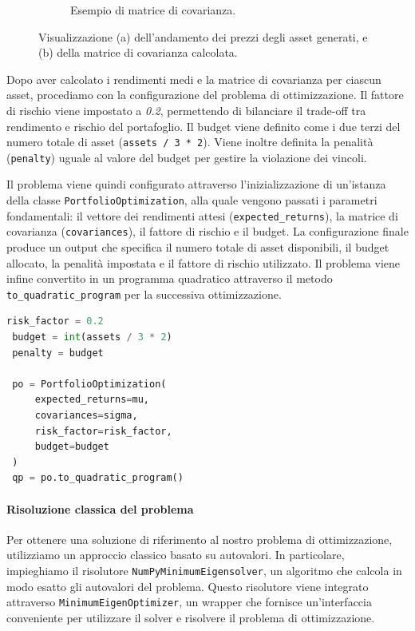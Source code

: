 \begin{figure}[h!]
\begin{subfigure}{0.45\textwidth}
        \caption{Esempio di matrice di covarianza.}
        \label{fig:matriceCovarianza}
    \end{subfigure}
    \caption{Visualizzazione (a) dell'andamento dei prezzi degli asset generati, e (b) della matrice di covarianza calcolata.}
\end{figure}

Dopo aver calcolato i rendimenti medi e la matrice di covarianza per ciascun 
asset, procediamo con la configurazione del problema di ottimizzazione. 
Il fattore di rischio viene impostato a \textit{0.2}, permettendo di bilanciare il 
trade-off tra rendimento e rischio del portafoglio. Il budget viene definito come 
i due terzi del numero totale di asset (\texttt{assets / 3 * 2}). Viene inoltre 
definita la penalità (\texttt{penalty}) uguale al valore del budget per gestire la 
violazione dei vincoli.

Il problema viene quindi configurato attraverso l'inizializzazione di 
un'istanza della classe \texttt{PortfolioOptimization}, alla quale vengono 
passati i parametri fondamentali: il vettore dei rendimenti attesi 
(\texttt{expected\_returns}), la matrice di covarianza (\texttt{covariances}), 
il fattore di rischio e il budget. La configurazione finale produce 
un output che specifica il numero totale di asset disponibili, 
il budget allocato, la penalità impostata e il fattore di rischio 
utilizzato. Il problema viene infine convertito in un programma 
quadratico attraverso il metodo \texttt{to\_quadratic\_program} per la 
successiva ottimizzazione.

\begin{lstlisting}[language=python, caption={Configurazione del problema di ottimizzazione del portafoglio.}]
 risk_factor = 0.2
 budget = int(assets / 3 * 2)
 penalty = budget

 po = PortfolioOptimization(
     expected_returns=mu, 
     covariances=sigma, 
     risk_factor=risk_factor, 
     budget=budget
 )
 qp = po.to_quadratic_program()
\end{lstlisting}

\paragraph{Risoluzione classica del problema}
Per ottenere una soluzione di riferimento al nostro problema di ottimizzazione, 
utilizziamo un approccio classico basato su autovalori. In particolare, 
impieghiamo il risolutore \texttt{NumPyMinimumEigensolver}, un algoritmo 
che calcola in modo esatto gli autovalori del problema. Questo risolutore 
viene integrato attraverso \texttt{MinimumEigenOptimizer}, un wrapper  
che fornisce un'interfaccia conveniente per utilizzare il solver e
risolvere il problema di ottimizzazione.


